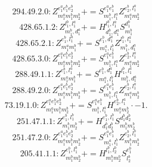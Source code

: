 \documentclass[letterpaper,10pt,fleqn,leqno,onecolumn]{article}
\begin{document}
\begin{equation} \;\;\;\;\;\;  294.49.2.0: Z^{e_{1}^{a}e_{1}^{b}e_{2}^{b}}_{m_{1}^{a}m_{1}^{b}m_{2}^{b}}+=S^{e_{1}^{a}e_{1}^{b}}_{m_{1}^{b},l_{1}^{a}}Z^{e_{2}^{b},l_{1}^{a}}_{m_{1}^{a}m_{2}^{b}} \end{equation}
\begin{equation} \;\;\;\;\;\;  428.65.1.2: Z^{l_{1}^{b},l_{1}^{a}}_{m_{1}^{b},d_{1}^{a}}+=H^{l_{1}^{b},l_{1}^{a}}_{d_{1}^{b},d_{1}^{a}}S^{d_{1}^{b}}_{m_{1}^{b}} \end{equation}
\begin{equation} \;\;\;\;\;\;  428.65.2.1: Z^{e_{1}^{b},l_{1}^{a}}_{m_{1}^{a}m_{1}^{b}}+=S^{e_{1}^{b},d_{1}^{a}}_{m_{1}^{a},l_{1}^{b}}Z^{l_{1}^{b},l_{1}^{a}}_{m_{1}^{b},d_{1}^{a}} \end{equation}
\begin{equation} \;\;\;\;\;\;  428.65.3.0: Z^{e_{1}^{a}e_{1}^{b}e_{2}^{b}}_{m_{1}^{a}m_{1}^{b}m_{2}^{b}}+=S^{e_{1}^{a}e_{1}^{b}}_{m_{1}^{b},l_{1}^{a}}Z^{e_{2}^{b},l_{1}^{a}}_{m_{1}^{a}m_{2}^{b}} \end{equation}
\begin{equation} \;\;\;\;\;\;  288.49.1.1: Z^{e_{1}^{b},l_{1}^{a}}_{m_{1}^{a}m_{1}^{b}}+=S^{e_{1}^{b},d_{1}^{a}}_{m_{1}^{a},l_{1}^{b}}H^{l_{1}^{b},l_{1}^{a}}_{m_{1}^{b},d_{1}^{a}} \end{equation}
\begin{equation} \;\;\;\;\;\;  288.49.2.0: Z^{e_{1}^{a}e_{1}^{b}e_{2}^{b}}_{m_{1}^{a}m_{1}^{b}m_{2}^{b}}+=S^{e_{1}^{a}e_{1}^{b}}_{m_{1}^{b},l_{1}^{a}}Z^{e_{2}^{b},l_{1}^{a}}_{m_{1}^{a}m_{2}^{b}} \end{equation}
\begin{equation} \;\;\;\;\;\;  73.19.1.0: Z^{e_{1}^{a}e_{1}^{b}e_{2}^{b}}_{m_{1}^{a}m_{1}^{b}m_{2}^{b}}+=S^{e_{1}^{a}e_{1}^{b}}_{m_{1}^{b},l_{1}^{a}}H^{e_{2}^{b},l_{1}^{a}}_{m_{1}^{a}m_{2}^{b}}\cdot -1. \end{equation}
\begin{equation} \;\;\;\;\;\;  251.47.1.1: Z^{e_{1}^{b},l_{1}^{b}}_{m_{1}^{b}m_{2}^{b}}+=H^{e_{1}^{b},l_{1}^{b}}_{d_{1}^{b}d_{2}^{b}}S^{d_{1}^{b}d_{2}^{b}}_{m_{1}^{b}m_{2}^{b}} \end{equation}
\begin{equation} \;\;\;\;\;\;  251.47.2.0: Z^{e_{1}^{a}e_{1}^{b}e_{2}^{b}}_{m_{1}^{a}m_{1}^{b}m_{2}^{b}}+=S^{e_{1}^{a}e_{1}^{b}}_{m_{1}^{a},l_{1}^{b}}Z^{e_{2}^{b},l_{1}^{b}}_{m_{1}^{b}m_{2}^{b}} \end{equation}
\begin{equation} \;\;\;\;\;\;  205.41.1.1: Z^{e_{1}^{b},l_{1}^{b}}_{m_{1}^{b}m_{2}^{b}}+=H^{l_{1}^{b},l_{2}^{b}}_{m_{1}^{b}m_{2}^{b}}S^{e_{1}^{b}}_{l_{2}^{b}} \end{equation}
\end{document}
